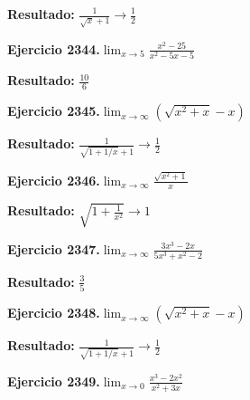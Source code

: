 \documentclass[10pt,a4paper]{article}
\begin{document}
\begin{solbox}
\textbf{Resultado:} \(\displaystyle \frac{1}{\sqrt{x}+1} \to \frac{1}{2}\)
\end{solbox}

\begin{ejbox}
\textbf{Ejercicio 2344.}\quad $\lim_{x\to 5} \frac{x^2-25}{x^2-5x-5}$
\end{ejbox}

\begin{solbox}
\textbf{Resultado:} \(\displaystyle \frac{10}{6}\)
\end{solbox}

\newpage
\begin{ejbox}
\textbf{Ejercicio 2345.}\quad $\lim_{x\to \infty} (\sqrt{x^2+x} - x)$
\end{ejbox}

\begin{solbox}
\textbf{Resultado:} \(\displaystyle \frac{1}{\sqrt{1+1/x}+1} \to \frac{1}{2}\)
\end{solbox}

\begin{ejbox}
\textbf{Ejercicio 2346.}\quad $\lim_{x\to \infty} \frac{\sqrt{x^2+1}}{x}$
\end{ejbox}

\begin{solbox}
\textbf{Resultado:} \(\displaystyle \sqrt{1+\frac{1}{x^2}} \to 1\)
\end{solbox}

\begin{ejbox}
\textbf{Ejercicio 2347.}\quad $\lim_{x\to \infty} \frac{3x^3 - 2x}{5x^3 + x^2 - 2}$
\end{ejbox}

\begin{solbox}
\textbf{Resultado:} \(\displaystyle \frac{3}{5}\)
\end{solbox}

\newpage
\begin{ejbox}
\textbf{Ejercicio 2348.}\quad $\lim_{x\to \infty} (\sqrt{x^2+x} - x)$
\end{ejbox}

\begin{solbox}
\textbf{Resultado:} \(\displaystyle \frac{1}{\sqrt{1+1/x}+1} \to \frac{1}{2}\)
\end{solbox}

\begin{ejbox}
\textbf{Ejercicio 2349.}\quad $\lim_{x\to 0} \frac{x^3-2x^2}{x^2+3x}$
\end{ejbox}
\end{document}
